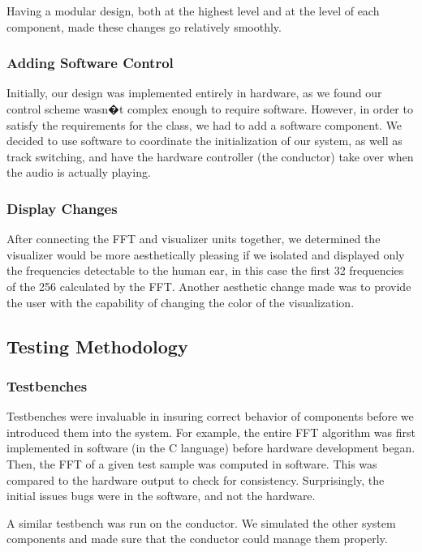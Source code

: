 \documentclass{article}
\begin{document}
Having a modular design, both at the highest level and at the level of each
component, made these changes go relatively smoothly.

\subsubsection{Adding Software Control}

Initially, our design was implemented entirely in hardware, as we found our control 
scheme wasn�t complex enough to require software. However, in order to satisfy the 
requirements for the class, we had to add a software component. We decided to use 
software to coordinate the initialization of our system, as well as track switching, and 
have the hardware controller (the conductor) take over when the audio is actually 
playing. 

\subsubsection{Display Changes}

After connecting the FFT and visualizer units together, we determined the visualizer 
would be more aesthetically pleasing if we isolated and displayed only the 
frequencies detectable to the human ear, in this case the first 32 frequencies of the 
256 calculated by the FFT.  Another aesthetic change made was to provide the user 
with the capability of changing the color of the visualization.

\subsection{Testing Methodology}

\subsubsection{Testbenches}

Testbenches were invaluable in insuring correct behavior of components before
we introduced them into the system. For example, the entire FFT algorithm  was
first implemented in software (in the C language) before hardware development
began. Then, the FFT of a given test sample was computed in software. This was
compared to the hardware output to check for consistency. Surprisingly, the
initial issues bugs were in the software, and not the hardware.

A similar testbench was run on the conductor. We simulated the other system
components and made sure that the conductor could manage them properly.
\end{document}
